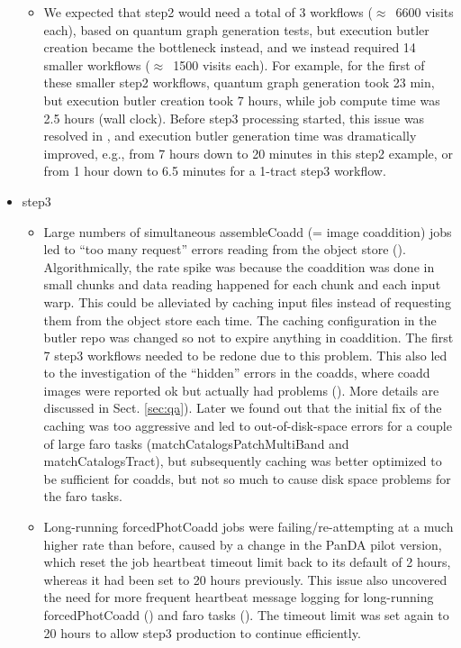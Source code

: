 \begin{itemize}
\begin{itemize}
 \item
 We expected that step2 would need a total of 3 workflows ($\approx$~6600 visits each), based on quantum graph generation tests, but execution butler creation became the bottleneck instead, and we instead required 14 smaller workflows ($\approx$~1500 visits each).
 For example, for the first of these smaller step2 workflows, quantum graph generation took 23 min, but execution butler creation took 7 hours, while job compute time was 2.5 hours (wall clock).
 Before step3 processing started, this issue was resolved in , and execution butler generation time was dramatically improved, e.g., from 7 hours down to 20 minutes in this step2 example, or from 1 hour down to 6.5 minutes for a 1-tract step3 workflow.

\end{itemize} %

\item step3
\begin{itemize}

  \item
  Large numbers of simultaneous assembleCoadd (= image coaddition) jobs led to ``too many request'' errors reading from the object store ().
  Algorithmically, the rate spike was because the coaddition was done in small chunks and data reading happened for each chunk and each input warp.
  This could be alleviated by caching input files instead of requesting them from the object store each time.
  The caching configuration in the butler repo was changed so not to expire anything in coaddition.
  The first 7 step3 workflows needed to be redone due to this problem.
  This also led to the investigation of the ``hidden'' errors in the coadds, where coadd images were reported ok but actually had problems ().
  More details are discussed in Sect. \ref{sec:qa}).
  Later we found out that the initial fix of the caching was too aggressive and led to out-of-disk-space errors for a couple of large faro tasks (matchCatalogsPatchMultiBand and matchCatalogsTract), but subsequently caching was better optimized to be sufficient for coadds, but not so much to cause disk space problems for the faro tasks.

  \item
  Long-running forcedPhotCoadd jobs were failing/re-attempting at a much higher rate than before, caused by a change in the PanDA pilot version, which reset the job heartbeat timeout limit back to its default of 2 hours, whereas it had been set to 20 hours previously.
  This issue also uncovered the need for more frequent heartbeat message logging for long-running forcedPhotCoadd () and faro tasks ().
  The timeout limit was set again to 20 hours to allow step3 production to continue efficiently.


\end{itemize}
\end{itemize}
